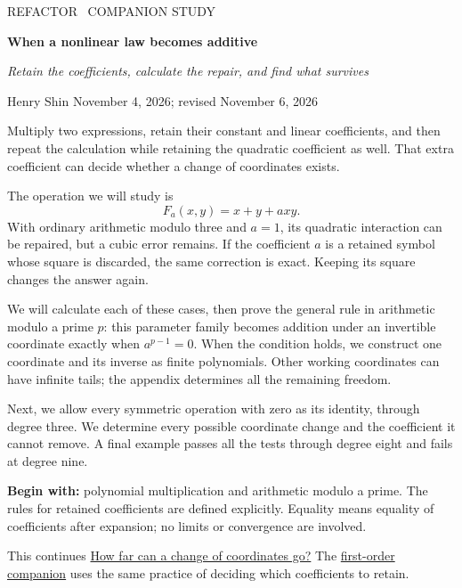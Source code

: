 \documentclass[11pt,letterpaper]{article}
\numberwithin{equation}{section}
\theoremstyle{definition}\newtheorem{example}[theorem]{Example}
\begin{document}
\color{ink}
\thispagestyle{empty}
{\sffamily\small\textcolor{accent}{REFACTOR \textperiodcentered\ COMPANION STUDY}\par}
\vspace{.6em}
{\LARGE\bfseries When a nonlinear law becomes additive\par}
\vspace{.4em}
{\large\itshape Retain the coefficients, calculate the repair, and find what survives\par}
\vspace{.7em}
{Henry Shin \hspace{.6em}\textperiodcentered\hspace{.6em} November 4, 2026; revised November 6, 2026\par}
\vspace{.6em}

Multiply two expressions, retain their constant and linear coefficients, and then repeat the calculation while retaining the quadratic coefficient as well. That extra coefficient can decide whether a change of coordinates exists.

The operation we will study is
\[
 F_a(x,y)=x+y+a xy.
\]
With ordinary arithmetic modulo three and \(a=1\), its quadratic interaction can be repaired, but a cubic error remains. If the coefficient \(a\) is a retained symbol whose square is discarded, the same correction is exact. Keeping its square changes the answer again.

We will calculate each of these cases, then prove the general rule in arithmetic modulo a prime \(p\): this parameter family becomes addition under an invertible coordinate exactly when \(a^{p-1}=0\). When the condition holds, we construct one coordinate and its inverse as finite polynomials. Other working coordinates can have infinite tails; the appendix determines all the remaining freedom.

Next, we allow every symmetric operation with zero as its identity, through degree three. We determine every possible coordinate change and the coefficient it cannot remove. A final example passes all the tests through degree eight and fails at degree nine.

\textbf{Begin with:} polynomial multiplication and arithmetic modulo a prime. The rules for retained coefficients are defined explicitly. Equality means equality of coefficients after expansion; no limits or convergence are involved.

\vspace{.3em}
{\small This continues \href{https://refactor.press/refactors/coordinate-repair}{How far can a change of coordinates go?} The \href{https://refactor.press/refactors/first-order}{first-order companion} uses the same practice of deciding which coefficients to retain.}
\end{document}
